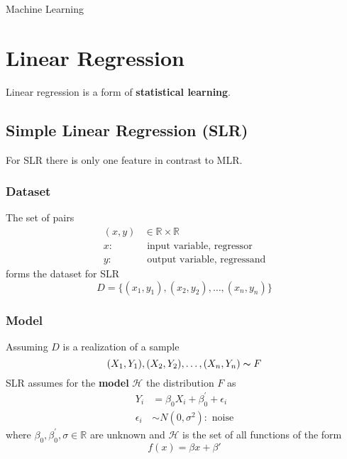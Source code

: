 \begin{center}
    \null{}
    \huge{Machine Learning\vspace*{0.4cm}\par}
\end{center}

\section{Linear Regression}
Linear regression is a form of \textbf{statistical learning}.
\subsection{Simple Linear Regression (SLR)}
For SLR there is only one feature in contrast to MLR.
\subsubsection{Dataset}
The set of pairs
\begin{align*}
    (x,y) & \in\mathbb{R}\times\mathbb{R}       \\
    x:    & \text{ input variable, regressor}   \\
    y:    & \text{ output variable, regressand}
\end{align*}
forms the dataset for SLR
\begin{equation*}
    D=\{(x_1,y_1),(x_2,y_2),\dots,(x_n,y_n)\}
\end{equation*}

\subsubsection{Model}
Assuming $D$ is a realization of a sample
\begin{equation*}
    (X_1,Y_1),(X_2,Y_2),\dots,(X_n,Y_n)\thicksim F
\end{equation*}
SLR assumes for the \textbf{model} $\mathcal{H}$ the distribution $F$ as
\begin{align*}
    Y_i        & =\beta_0X_i+\beta^{\prime}_0+\epsilon_i \\
    \epsilon_i & \sim N(0,\sigma^2): \text{ noise}
\end{align*}
where $\beta_0,\beta^{\prime}_0,\sigma\in\mathbb{R}$ are unknown and $\mathcal{H}$ is the set of all functions of the form
\begin{equation*}
    f(x)=\beta x+\beta'
\end{equation*}



